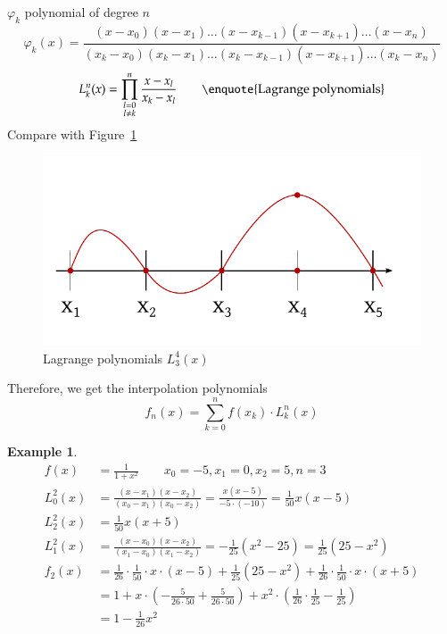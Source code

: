 \documentclass{article}
\newtheorem{example}{Example}
\begin{document}
$\varphi_k$ polynomial of degree $n$
\[
  \varphi_k(x) = \frac{(x - x_0) (x - x_1) \dots (x - x_{k-1}) (x - x_{k+1}) \dots (x - x_n)}{(x_k - x_0) (x_k - x_1) \dots (x_k - x_{k-1}) (x - x_{k+1}) \dots (x_k - x_n)}
\] \[
  L_k^n(x) = \prod_{\substack{l = 0 \\ l \neq k}}^n \frac{x - x_l}{x_k - x_l} \qquad \text{\enquote{Lagrange polynomials}}
\]
Compare with Figure~\ref{img:lagrange-poly}

\begin{figure}[!h]
  \begin{center}
    \includegraphics{img/02_lagrange_polynomial.pdf}
    \caption{Lagrange polynomials $L_3^4(x)$}
    \label{img:lagrange-poly}
  \end{center}
\end{figure}

Therefore, we get the interpolation polynomials
\[ f_n(x) = \sum_{k=0}^n f(x_k) \cdot L_k^n(x) \]

\begin{example}
  \begin{align*}
    f(x) &= \frac{1}{1 + x^2} \qquad x_0 = -5, x_1 = 0, x_2 = 5, n = 3 \\
    L_0^2(x) &= \frac{(x - x_1) (x - x_2)}{(x_0 - x_1) (x_0 - x_2)} = \frac{x (x - 5)}{-5 \cdot (-10)} = \frac{1}{50} x ( x - 5) \\
    L_2^2(x) &= \frac1{50} x (x + 5) \\
    L_1^2(x) &= \frac{(x - x_0) (x - x_2)}{(x_1 - x_0) (x_1 - x_2)} = -\frac1{25} (x^2 - 25) = \frac{1}{25} (25 - x^2) \\
    f_2(x) &= \frac1{26} \cdot \frac1{50} \cdot x \cdot (x - 5) + \frac1{25} (25 - x^2) + \frac1{26} \cdot \frac1{50} \cdot x \cdot (x + 5) \\
    &= 1 + x \cdot \left(-\frac{5}{26 \cdot 50} + \frac{5}{26 \cdot 50}\right) + x^2 \cdot \left(\frac{1}{26} \cdot \frac{1}{25} - \frac{1}{25}\right) \\
    &= 1 - \frac{1}{26} x^2
  \end{align*}
\end{example}
\end{document}

